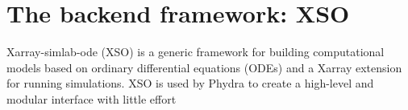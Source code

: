 \documentclass[journal abbreviation, manuscript]{copernicus}
\begin{document}
\section{The backend framework: XSO}

Xarray-simlab-ode (XSO) is a generic framework for building computational models based on ordinary differential equations (ODEs) and a Xarray extension for running simulations. XSO is used by Phydra to create a high-level and modular interface with little effort
\end{document}

